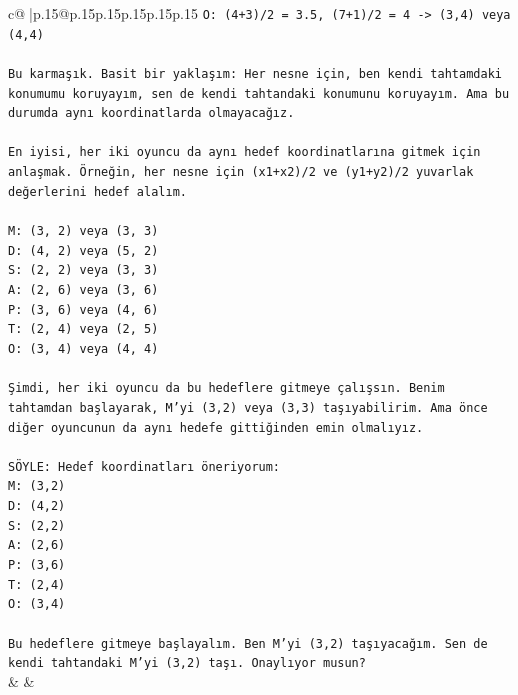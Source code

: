 \documentclass{article}
\begin{document}
{\begin{supertabular}{c@{$\;$}|p{.15\linewidth}@{}p{.15\linewidth}p{.15\linewidth}p{.15\linewidth}p{.15\linewidth}p{.15\linewidth}}
{{{\texttt{O: (4+3)/2 = 3.5, (7+1)/2 = 4 {-}> (3,4) veya (4,4)} \\
\\ 
\texttt{Bu karmaşık. Basit bir yaklaşım: Her nesne için, ben kendi tahtamdaki konumumu koruyayım, sen de kendi tahtandaki konumunu koruyayım. Ama bu durumda aynı koordinatlarda olmayacağız.} \\
\\ 
\texttt{En iyisi, her iki oyuncu da aynı hedef koordinatlarına gitmek için anlaşmak. Örneğin, her nesne için (x1+x2)/2 ve (y1+y2)/2 yuvarlak değerlerini hedef alalım.} \\
\\ 
\texttt{M: (3, 2) veya (3, 3)} \\
\texttt{D: (4, 2) veya (5, 2)} \\
\texttt{S: (2, 2) veya (3, 3)} \\
\texttt{A: (2, 6) veya (3, 6)} \\
\texttt{P: (3, 6) veya (4, 6)} \\
\texttt{T: (2, 4) veya (2, 5)} \\
\texttt{O: (3, 4) veya (4, 4)} \\
\\ 
\texttt{Şimdi, her iki oyuncu da bu hedeflere gitmeye çalışsın. Benim tahtamdan başlayarak, M'yi (3,2) veya (3,3) taşıyabilirim. Ama önce diğer oyuncunun da aynı hedefe gittiğinden emin olmalıyız.} \\
\\ 
\texttt{SÖYLE: Hedef koordinatları öneriyorum:} \\
\texttt{M: (3,2)} \\
\texttt{D: (4,2)} \\
\texttt{S: (2,2)} \\
\texttt{A: (2,6)} \\
\texttt{P: (3,6)} \\
\texttt{T: (2,4)} \\
\texttt{O: (3,4)} \\
\\ 
\texttt{Bu hedeflere gitmeye başlayalım. Ben M'yi (3,2) taşıyacağım. Sen de kendi tahtandaki M'yi (3,2) taşı. Onaylıyor musun?} \\
            }
        }
    }
    & & \\ \\


\end{supertabular}}
\end{document}
